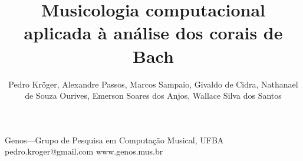 \documentclass[brazil]{article}
\begin{document}
\graphicspath{{figs/}}

\title{Musicologia computacional aplicada à análise dos corais de Bach}
\author{Pedro Kröger, Alexandre Passos, Marcos Sampaio, Givaldo de
  Cidra, Nathanael de Souza Ourives, Emerson Soares dos Anjos, Wallace Silva dos Santos}
  {Genos---Grupo de Pesquisa em Computação Musical, UFBA}
  {pedro.kroger@gmail.com}
  {www.genos.mus.br}



\begin{sumario}

\end{sumario}






\end{document}
